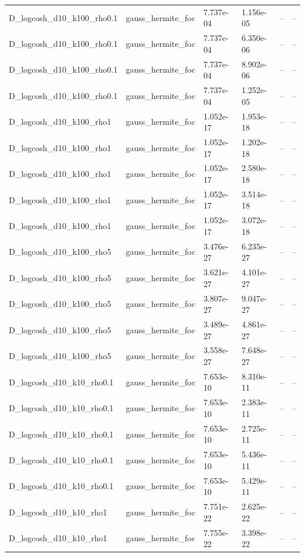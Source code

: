 \begin{tabular}{llllll}
D\_logcosh\_d10\_k100\_rho0.1 & gauss\_hermite\_foc & 7.737e-04 & 1.156e-05 & -- & -- \\
D\_logcosh\_d10\_k100\_rho0.1 & gauss\_hermite\_foc & 7.737e-04 & 6.350e-06 & -- & -- \\
D\_logcosh\_d10\_k100\_rho0.1 & gauss\_hermite\_foc & 7.737e-04 & 8.902e-06 & -- & -- \\
D\_logcosh\_d10\_k100\_rho0.1 & gauss\_hermite\_foc & 7.737e-04 & 1.252e-05 & -- & -- \\
D\_logcosh\_d10\_k100\_rho1 & gauss\_hermite\_foc & 1.052e-17 & 1.953e-18 & -- & -- \\
D\_logcosh\_d10\_k100\_rho1 & gauss\_hermite\_foc & 1.052e-17 & 1.202e-18 & -- & -- \\
D\_logcosh\_d10\_k100\_rho1 & gauss\_hermite\_foc & 1.052e-17 & 2.580e-18 & -- & -- \\
D\_logcosh\_d10\_k100\_rho1 & gauss\_hermite\_foc & 1.052e-17 & 3.514e-18 & -- & -- \\
D\_logcosh\_d10\_k100\_rho1 & gauss\_hermite\_foc & 1.052e-17 & 3.072e-18 & -- & -- \\
D\_logcosh\_d10\_k100\_rho5 & gauss\_hermite\_foc & 3.476e-27 & 6.235e-27 & -- & -- \\
D\_logcosh\_d10\_k100\_rho5 & gauss\_hermite\_foc & 3.621e-27 & 4.101e-27 & -- & -- \\
D\_logcosh\_d10\_k100\_rho5 & gauss\_hermite\_foc & 3.807e-27 & 9.047e-27 & -- & -- \\
D\_logcosh\_d10\_k100\_rho5 & gauss\_hermite\_foc & 3.489e-27 & 4.861e-27 & -- & -- \\
D\_logcosh\_d10\_k100\_rho5 & gauss\_hermite\_foc & 3.558e-27 & 7.648e-27 & -- & -- \\
D\_logcosh\_d10\_k10\_rho0.1 & gauss\_hermite\_foc & 7.653e-10 & 8.310e-11 & -- & -- \\
D\_logcosh\_d10\_k10\_rho0.1 & gauss\_hermite\_foc & 7.653e-10 & 2.383e-11 & -- & -- \\
D\_logcosh\_d10\_k10\_rho0.1 & gauss\_hermite\_foc & 7.653e-10 & 2.725e-11 & -- & -- \\
D\_logcosh\_d10\_k10\_rho0.1 & gauss\_hermite\_foc & 7.653e-10 & 5.436e-11 & -- & -- \\
D\_logcosh\_d10\_k10\_rho0.1 & gauss\_hermite\_foc & 7.653e-10 & 5.429e-11 & -- & -- \\
D\_logcosh\_d10\_k10\_rho1 & gauss\_hermite\_foc & 7.751e-22 & 2.625e-22 & -- & -- \\
D\_logcosh\_d10\_k10\_rho1 & gauss\_hermite\_foc & 7.755e-22 & 3.398e-22 & -- & -- \\

\end{tabular}
